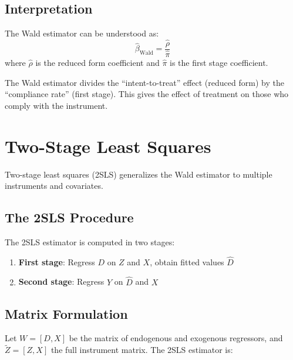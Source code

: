 \subsection{Interpretation}

The Wald estimator can be understood as:
\begin{equation}
\hat{\beta}_{\text{Wald}} = \frac{\hat{\rho}}{\hat{\pi}}
\end{equation}
where $\hat{\rho}$ is the reduced form coefficient and $\hat{\pi}$ is the first stage coefficient.

\begin{insight}
The Wald estimator divides the ``intent-to-treat'' effect (reduced form) by the ``compliance rate'' (first stage). This gives the effect of treatment on those who comply with the instrument.
\end{insight}


\section{Two-Stage Least Squares}
\label{sec:iv_2sls}

Two-stage least squares (2SLS) generalizes the Wald estimator to multiple instruments and covariates.

\subsection{The 2SLS Procedure}

\begin{definition}
\label{def:2sls}
The 2SLS estimator is computed in two stages:
\begin{enumerate}
    \item \textbf{First stage}: Regress $D$ on $Z$ and $X$, obtain fitted values $\hat{D}$
    \item \textbf{Second stage}: Regress $Y$ on $\hat{D}$ and $X$
\end{enumerate}
\end{definition}

\subsection{Matrix Formulation}

Let $W = [D, X]$ be the matrix of endogenous and exogenous regressors, and $\tilde{Z} = [Z, X]$ the full instrument matrix. The 2SLS estimator is:

